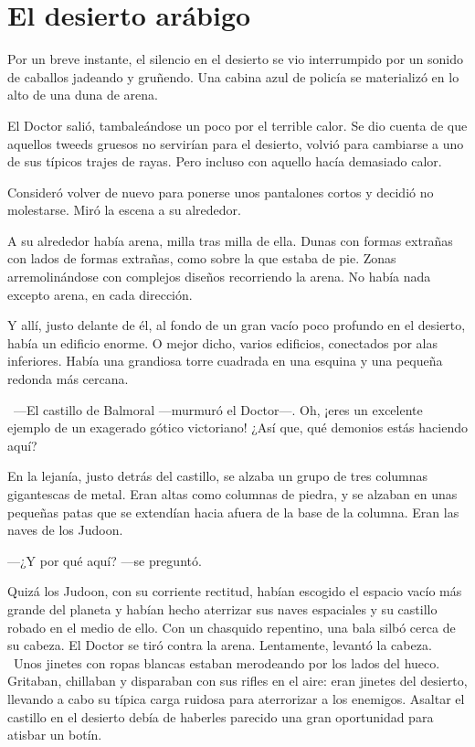 \chapter*{El desierto arábigo}

Por un breve instante, el silencio en el desierto se vio interrumpido
por un sonido de caballos jadeando y gruñendo. Una cabina azul de
policía se materializó en lo alto de una duna de arena.

El Doctor salió, tambaleándose un poco por el terrible calor. Se dio
cuenta de que aquellos tweeds gruesos no servirían para el desierto,
volvió para cambiarse a uno de sus típicos trajes de rayas. Pero incluso
con aquello hacía demasiado calor.

Consideró volver de nuevo para ponerse unos pantalones cortos y decidió
no molestarse. Miró la escena a su alrededor.

A su alrededor había arena, milla tras milla de ella. Dunas con formas
extrañas con lados de formas extrañas, como sobre la que estaba de pie.
Zonas arremolinándose con complejos diseños recorriendo la arena. No
había nada excepto arena, en cada dirección.

Y allí, justo delante de él, al fondo de un gran vacío poco profundo en
el desierto, había un edificio enorme. O mejor dicho, varios edificios,
conectados por alas inferiores. Había una grandiosa torre cuadrada en
una esquina y una pequeña redonda más cercana.

~---El castillo de Balmoral ---murmuró el Doctor---. Oh, ¡eres un
excelente ejemplo de un exagerado gótico victoriano! ¿Así que, qué
demonios estás haciendo aquí?

En la lejanía, justo detrás del castillo, se alzaba un grupo de tres
columnas gigantescas de metal. Eran altas como columnas de piedra, y se
alzaban en unas pequeñas patas que se extendían hacia afuera de la base
de la columna. Eran las naves de los Judoon.

---¿Y por qué aquí? ---se preguntó.

Quizá los Judoon, con su corriente rectitud, habían escogido el espacio
vacío más grande del planeta y habían hecho aterrizar sus naves
espaciales y su castillo robado en el medio de ello. Con un chasquido
repentino, una bala silbó cerca de su cabeza. El Doctor se tiró contra
la arena. Lentamente, levantó la cabeza. ~Unos jinetes con ropas blancas
estaban merodeando por los lados del hueco. Gritaban, chillaban y
disparaban con sus rifles en el aire: eran jinetes del desierto,
llevando a cabo su típica carga ruidosa para aterrorizar a los enemigos.
Asaltar el castillo en el desierto debía de haberles parecido una gran
oportunidad para atisbar un botín.

